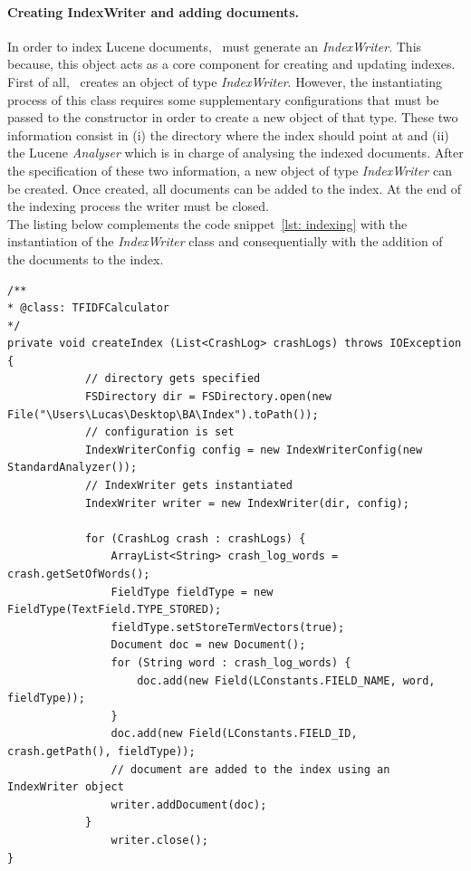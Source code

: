 \paragraph{Creating IndexWriter and adding documents.}
In order to index Lucene documents, \toolname\ must generate an \textit{IndexWriter}. This because, this object acts as a core component for creating and updating indexes. 
First of all, \toolname\ creates an object of type \textit{IndexWriter}. However, the instantiating process of this class requires some supplementary configurations that must be passed to the constructor in order to create a new object of that type. 
These two information consist in (i) the directory where the index should point at and (ii) the Lucene \textit{Analyser} which is in charge of analysing the indexed documents. 
After the specification of these two information, a new object of type \textit{IndexWriter} can be created. 
Once created, all documents can be added to the index. At the end of the indexing process the writer must be closed.\\
The listing below complements the code snippet~\ref{lst: indexing} with the instantiation of the \textit{IndexWriter} class and consequentially with the addition of the documents to the index.  
\begin{lstlisting}[caption=\TFIDF\ describing the instantiation of an IndexWriter,label={lst: indexwriter}]
/**
* @class: TFIDFCalculator
*/
private void createIndex (List<CrashLog> crashLogs) throws IOException {
			// directory gets specified
		    FSDirectory dir = FSDirectory.open(new File("\Users\Lucas\Desktop\BA\Index").toPath());
		    // configuration is set
            IndexWriterConfig config = new IndexWriterConfig(new StandardAnalyzer());
            // IndexWriter gets instantiated 
            IndexWriter writer = new IndexWriter(dir, config);
	
            for (CrashLog crash : crashLogs) {
                ArrayList<String> crash_log_words = crash.getSetOfWords();
                FieldType fieldType = new FieldType(TextField.TYPE_STORED); 
                fieldType.setStoreTermVectors(true); 
                Document doc = new Document(); 
                for (String word : crash_log_words) {
                    doc.add(new Field(LConstants.FIELD_NAME, word, fieldType)); 
                }
                doc.add(new Field(LConstants.FIELD_ID, crash.getPath(), fieldType));
                // document are added to the index using an IndexWriter object
                writer.addDocument(doc);
   			}
                writer.close();
}
    
\end{lstlisting} 
